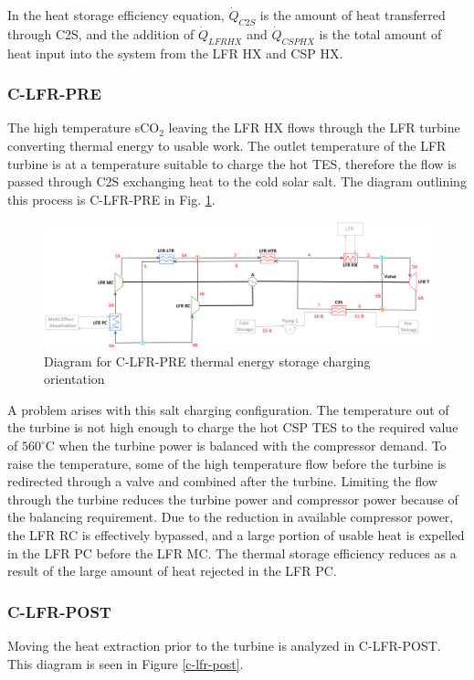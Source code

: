 \begin{paracol}{2}
In the heat storage efficiency equation, $\dot{Q}_{C2S}$ is the amount of heat transferred through C2S, and the addition of $\dot{Q}_{LFRHX}$ and $\dot{Q}_{CSPHX}$ is the total amount of heat input into the system from the LFR HX and CSP HX. 

\subsubsection{C-LFR-PRE} 

The high temperature sCO$_2$ leaving the LFR HX flows through the LFR turbine converting thermal energy to usable work. The outlet temperature of the LFR turbine is at a temperature suitable to charge the hot TES, therefore the flow is passed through C2S exchanging heat to the cold solar salt. The diagram outlining this process is C-LFR-PRE in Fig. \ref{c-lfr-pre}. 

\end{paracol}
\begin{figure}[H]
    \widefigure
    \includegraphics[width=\linewidth]{Definitions/c-lfr-pre.pdf}
    \caption{Diagram for C-LFR-PRE thermal energy storage charging orientation\label{c-lfr-pre}}
\end{figure}
\begin{paracol}{2}
\linenumbers
\switchcolumn

A problem arises with this salt charging configuration. The temperature out of the turbine is not high enough to charge the hot CSP TES to the required value of $560^{\circ}$C when the turbine power is balanced with the compressor demand. To raise the temperature, some of the high temperature flow before the turbine is redirected through a valve and combined after the turbine. Limiting the flow through the turbine reduces the turbine power and compressor power because of the balancing requirement. Due to the reduction in available compressor power, the LFR RC is effectively bypassed, and a large portion of usable heat is expelled in the LFR PC before the LFR MC. The thermal storage efficiency reduces as a result of the large amount of heat rejected in the LFR PC. 



\subsubsection{C-LFR-POST} 

Moving the heat extraction prior to the turbine is analyzed in C-LFR-POST. This diagram is seen in Figure \ref{c-lfr-post}.

\end{paracol}
